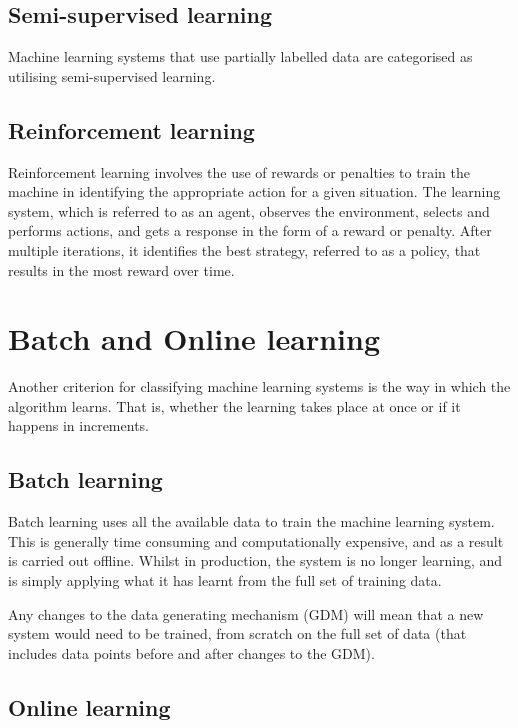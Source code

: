 \documentclass[]{book}
\begin{document}
\subsection{Semi-supervised learning}\label{semi-supervised-learning}

Machine learning systems that use partially labelled data are
categorised as utilising semi-supervised learning.

\subsection{Reinforcement learning}\label{reinforcement-learning}

Reinforcement learning involves the use of rewards or penalties to train
the machine in identifying the appropriate action for a given situation.
The learning system, which is referred to as an agent, observes the
environment, selects and performs actions, and gets a response in the
form of a reward or penalty. After multiple iterations, it identifies
the best strategy, referred to as a policy, that results in the most
reward over time.

\section{Batch and Online learning}\label{batch-and-online-learning}

Another criterion for classifying machine learning systems is the way in
which the algorithm learns. That is, whether the learning takes place at
once or if it happens in increments.

\subsection{Batch learning}\label{batch-learning}

Batch learning uses all the available data to train the machine learning
system. This is generally time consuming and computationally expensive,
and as a result is carried out offline. Whilst in production, the system
is no longer learning, and is simply applying what it has learnt from
the full set of training data.

Any changes to the data generating mechanism (GDM) will mean that a new
system would need to be trained, from scratch on the full set of data
(that includes data points before and after changes to the GDM).

\subsection{Online learning}\label{online-learning}
\end{document}
